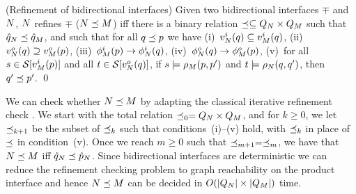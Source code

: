 \begin{defi}{(Refinement of bidirectional  interfaces)}
Given two bidirectional  interfaces $\mp$ and $N$, $N$ refines
$\mp$ ($N \preceq M$) iff there is 
a binary relation $\preceq \subseteq Q_{N} \times Q_M$ 
such that $\hat{q}_{N} \preceq \hat{q}_M$, 
and such that for all $q \preceq p$ we have 
(i)~$v^i_N(q) \subseteq v^i_M(q)$, 
(ii)~$v^o_{N}(q) \supseteq v^o_M(p)$, 
(iii)~$\phi^i_{M}(p) \rightarrow \phi^i_N(q)$, 
(iv)~$\phi^o_N(q) \rightarrow \phi^o_M(p)$, 
(v)~for all $s \in {\cal S}[v^i_M(p)]$ 
and all $t \in {\cal S}[v^o_N(q)]$, 
if $s \models \rho_M(p,p')$ and $t \models \rho_N(q,q')$, 
then $q' \preceq p'$. \qed 
\end{defi}

\noindent
We can check whether $N \preceq M$ by adapting the classical
iterative refinement check \cite{Milner71}. 
We start with the total relation $\preceq_0 = Q_N \times Q_M$, and
for $k \geq 0$, we let $\preceq_{k+1}$ be the subset of $\preceq_k$ such
that conditions~(i)--(v) hold, with $\preceq_k$ in place of $\preceq$ in
condition~(v). 
Once we reach $m \geq 0$ such that $\preceq_{m+1} = \preceq_m$, we have
that $N \preceq M$ iff $\hat{q}_N \preceq \hat{p}_N$. 
Since bidirectional interfaces are deterministic we can reduce
the refinement checking problem to graph reachability on the product
interface and hence $N \preceq M$ can be decided in $O(|Q_N| \times
|Q_M|)$ time.

\begin{comment} 
%
%
\mynote{I cut out the algorithm here} 
\begin{algorithm}[ht]
\caption{Refinement Check for Stateful Bidirectional  Interfaces} \label{algo2}
\begin{algorithmic}[1]
\REQUIRE two stateful bidirectional  interfaces 
$F = (P_F,Q_F,\hat{q}_F,o_F,o^+_F,\phi_F,\psi_F,\delta_F)$ and
$F' = (P_{F'},Q_{F'},\hat{q}_{F'},o_{F'},o^+_{F'},\phi_{F'},\psi_{F'},\delta_{F'})$
\STATE Let $Prod_{F,F'} = F \circledast F' =$ a \emph{directed graph} 
$G(V_{Prod},E_{Prod})$ where 
$V_{Prod} = Q_F \times Q_{F'}$ and $E_{Prod} \subs V_{Prod} \times V_{Prod}$
such that $e = (v_1,v_2) \in E_{Prod}$ iff $v_1 = (q_1,q'_1)$, $v_2 = (q_2,q'_2)$
and $\exists$ valuations $i \in [P_F - o^+_F(q_1)]$, $o' \in [o_{F'}(q'_1]$ such that 
$\phi_F(q_1) @ i$ and $\psi_{F'}(q'_1) @ o'$ and $q_2 = \delta_F(q_1,i \uplus o')$
and $q'_2 = \delta_{F'}(q'_1,i \uplus o')$.
\STATE Let a state $v = (q,q')$ be an {\em error} state iff 
$(o_{F'}(q') \nsupseteq o_F(q)) \lor (o^+_{F'}(q') \nsubseteq o^+_F(q)) 
\lor (P_{F'} - o^+_{F'}(q') \nsubseteq P_F - o^+_F(q)) \lor 
(\phi_F(q) \nRightarrow \phi_{F'}(q')) \lor 
(\psi_{F'}(q') \nRightarrow \psi_F(q))$.
\IF {any error state is reachable from $(\hat{q}_F,\hat{q}_{F'})$ in 
$G(V_{Prod},E_{Prod})$}
\STATE $F'$ does not refine $F$
\ELSE
\STATE $F'$ refines $F$
\ENDIF
\end{algorithmic}
\end{algorithm}
\end{comment} 

